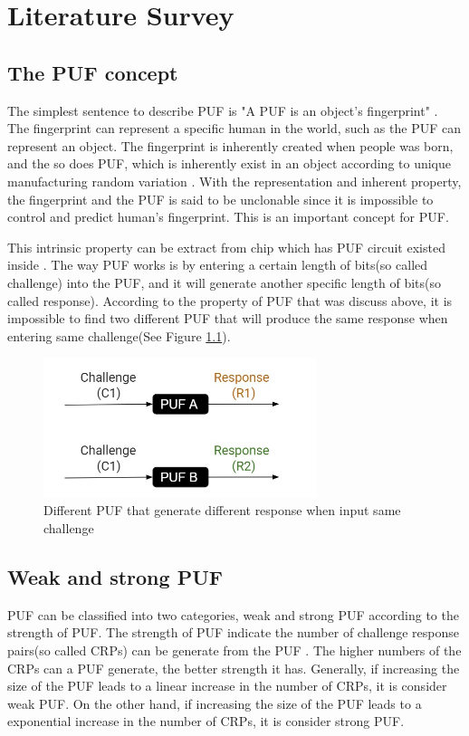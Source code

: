 \chapter{Literature Survey}

\section{The PUF concept}
The simplest sentence to describe PUF is "A PUF is an object's fingerprint" \cite{Reference4}. The fingerprint can represent a specific human in the world, such as the PUF can represent
an object. The fingerprint is inherently created when people was born, and the so does PUF, which is inherently exist in an object according to unique manufacturing random variation \cite{Reference4}.
With the representation and inherent property, the fingerprint and the PUF is said to be unclonable since it is impossible to control and predict human's fingerprint. This is an important concept for PUF. \par

This intrinsic property can be extract from chip which has PUF circuit existed inside \cite{Reference2}. The way PUF works is by entering a certain length of bits(so called challenge) into the PUF, and it will
generate another specific length of bits(so called response). According to the property of PUF that was discuss above, it is impossible to find two different PUF that will produce the same response when entering same challenge(See Figure \ref{fig:figure1}).
\begin{figure}[ht]
\centering
\includegraphics[width=8cm]{figures/figure1.jpg}
\caption{Different PUF that generate different response when input same challenge}
\label{fig:figure1}
\end{figure}

\section{Weak and strong PUF}
PUF can be classified into two categories, weak and strong PUF according to the strength of PUF. The strength of PUF indicate the number of challenge response pairs(so called CRPs) can be generate 
from the PUF \cite{Reference1}. The higher numbers of the CRPs can a PUF generate, the better strength it has. Generally, if increasing the size of the PUF leads to a linear increase in the number of CRPs, it is consider weak PUF. 
On the other hand, if increasing the size of the PUF leads to a exponential increase in the number of CRPs, it is consider strong PUF.\par

